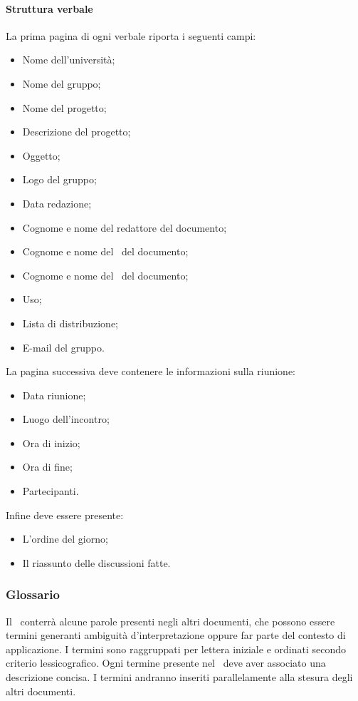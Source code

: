 \documentclass[../NormeDiProgetto.tex]{subfiles}
\begin{document}
					\paragraph{Struttura verbale\\}
						La prima pagina di ogni verbale riporta i seguenti campi:
						\begin{itemize}
							\item Nome dell'università;
							\item Nome del gruppo;
							\item Nome del progetto;
							\item Descrizione del progetto;
							\item Oggetto;
							\item Logo del gruppo;
							\item Data redazione;
							\item Cognome e nome del redattore del documento;
							\item Cognome e nome del \verificatore\ del documento;
							\item Cognome e nome del \responsabilediprogetto\ del documento;
							\item Uso;
							\item Lista di distribuzione;
							\item E-mail del gruppo.
						\end{itemize}
						La pagina successiva deve contenere le informazioni sulla riunione:
						\begin{itemize}
							\item Data riunione;
							\item Luogo dell'incontro;
							\item Ora di inizio;
							\item Ora di fine;
							\item Partecipanti.
						\end{itemize}
						Infine deve essere presente:
						\begin{itemize}
							\item L'ordine del giorno;
							\item Il riassunto delle discussioni fatte.
						\end{itemize}
			\subsubsection{Glossario}
				Il \glossario\ conterrà alcune parole presenti negli altri documenti, che possono essere
				termini generanti ambiguità d'interpretazione oppure far parte del contesto di applicazione.
				I termini sono raggruppati per lettera iniziale e ordinati secondo criterio lessicografico.
				Ogni termine presente nel \glossario\ deve aver associato una descrizione concisa.
				I termini andranno inseriti parallelamente alla stesura degli altri documenti.
\end{document}
